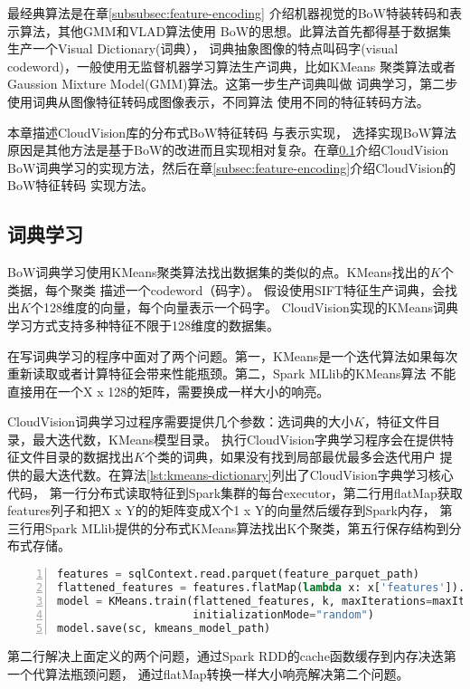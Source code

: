 最经典算法是在章\ref{subsubsec:feature-encoding}
介绍机器视觉的BoW特装转码和表示算法，其他GMM和VLAD算法使用
BoW的思想。此算法首先都得基于数据集生产一个Visual Dictionary(词典），
词典抽象图像的特点叫码字(visual codeword)，一般使用无监督机器学习算法生产词典，比如KMeans
聚类算法或者Gaussion Mixture Model(GMM)算法。这第一步生产词典叫做
词典学习，第二步使用词典从图像特征转码成图像表示，不同算法
使用不同的特征转码方法。

本章描述CloudVision库的分布式BoW特征转码
与表示实现，
选择实现BoW算法原因是其他方法是基于BoW的改进而且实现相对复杂。在章\ref{subsec:dict-learning}介绍CloudVision
BoW词典学习的实现方法，然后在章\ref{subsec:feature-encoding}介绍CloudVision的BoW特征转码
实现方法。

\subsection{词典学习}
\label{subsec:dict-learning}
BoW词典学习使用KMeans聚类算法找出数据集的类似的点。KMeans找出的$K$个类据，每个聚类
描述一个codeword（码字）。
假设使用SIFT特征生产词典，会找出$K$个128维度的向量，每个向量表示一个码字。
CloudVision实现的KMeans词典学习方式支持多种特征不限于128维度的数据集。

在写词典学习的程序中面对了两个问题。第一，KMeans是一个迭代算法如果每次
重新读取或者计算特征会带来性能瓶颈。第二，Spark MLlib的KMeans算法
不能直接用在一个X x 128的矩阵，需要换成一样大小的响亮。

CloudVision词典学习过程序需要提供几个参数：选词典的大小$K$，特征文件目录，最大迭代数，KMeans模型目录。
执行CloudVision字典学习程序会在提供特征文件目录的数据找出$K$个类的词典，如果没有找到局部最优最多会迭代用户
提供的最大迭代数。在算法\ref{lst:kmeans-dictionary}列出了CloudVision字典学习核心代码，
第一行分布式读取特征到Spark集群的每台executor，第二行用flatMap获取features列子和把X x Y的的矩阵变成X个1 x Y的向量然后缓存到Spark内存，
第三行用Spark MLlib提供的分布式KMeans算法找出K个聚类，第五行保存结构到分布式存储。
\begin{lstlisting}[language=Python,
                   basicstyle=\small,
                   showstringspaces=false,
                   numbers=left,
                   caption={词典学习核心代码},
                   label={lst:kmeans-dictionary}]
features = sqlContext.read.parquet(feature_parquet_path)
flattened_features = features.flatMap(lambda x: x['features']).cache()
model = KMeans.train(flattened_features, k, maxIterations=maxIter,
                     initializationMode="random")
model.save(sc, kmeans_model_path)
\end{lstlisting}
第二行解决上面定义的两个问题，通过Spark RDD的cache函数缓存到内存决迭第一个代算法瓶颈问题，
通过flatMap转换一样大小响亮解决第二个问题。


